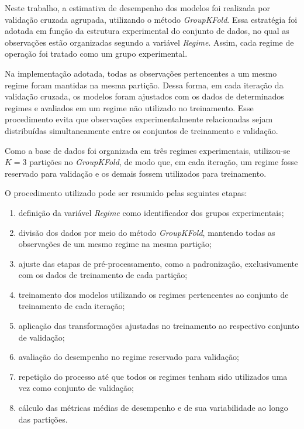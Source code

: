 Neste trabalho, a estimativa de desempenho dos modelos foi realizada por validação cruzada agrupada, utilizando o método \textit{GroupKFold}. Essa estratégia foi adotada em função da estrutura experimental do conjunto de dados, no qual as observações estão organizadas segundo a variável \textit{Regime}. Assim, cada regime de operação foi tratado como um grupo experimental.

Na implementação adotada, todas as observações pertencentes a um mesmo regime foram mantidas na mesma partição. Dessa forma, em cada iteração da validação cruzada, os modelos foram ajustados com os dados de determinados regimes e avaliados em um regime não utilizado no treinamento. Esse procedimento evita que observações experimentalmente relacionadas sejam distribuídas simultaneamente entre os conjuntos de treinamento e validação.

Como a base de dados foi organizada em três regimes experimentais, utilizou-se \(K=3\) partições no \textit{GroupKFold}, de modo que, em cada iteração, um regime fosse reservado para validação e os demais fossem utilizados para treinamento.

O procedimento utilizado pode ser resumido pelas seguintes etapas:

\begin{enumerate}
    \item definição da variável \textit{Regime} como identificador dos grupos experimentais;
    \item divisão dos dados por meio do método \textit{GroupKFold}, mantendo todas as observações de um mesmo regime na mesma partição;
    \item ajuste das etapas de pré-processamento, como a padronização, exclusivamente com os dados de treinamento de cada partição;
    \item treinamento dos modelos utilizando os regimes pertencentes ao conjunto de treinamento de cada iteração;
    \item aplicação das transformações ajustadas no treinamento ao respectivo conjunto de validação;
    \item avaliação do desempenho no regime reservado para validação;
    \item repetição do processo até que todos os regimes tenham sido utilizados uma vez como conjunto de validação;
    \item cálculo das métricas médias de desempenho e de sua variabilidade ao longo das partições.
\end{enumerate}

